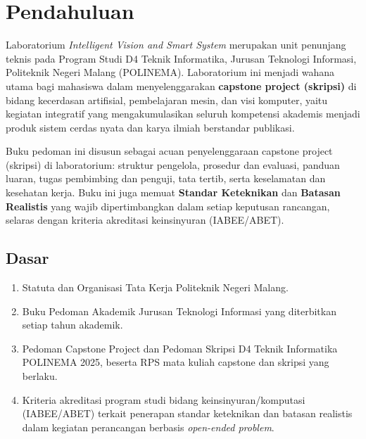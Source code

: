 \documentclass[12pt,a4paper]{report}
\begin{document}
\PedomanCover

\clearpage
\tableofcontents

\clearpage
{}

\chapter{Pendahuluan}

Laboratorium \emph{Intelligent Vision and Smart System} merupakan unit penunjang teknis pada Program Studi D4 Teknik Informatika, Jurusan Teknologi Informasi, Politeknik Negeri Malang (POLINEMA). Laboratorium ini menjadi wahana utama bagi mahasiswa dalam menyelenggarakan \textbf{capstone project (skripsi)} di bidang kecerdasan artifisial, pembelajaran mesin, dan visi komputer, yaitu kegiatan integratif yang mengakumulasikan seluruh kompetensi akademis menjadi produk sistem cerdas nyata dan karya ilmiah berstandar publikasi.

Buku pedoman ini disusun sebagai acuan penyelenggaraan capstone project (skripsi) di laboratorium: struktur pengelola, prosedur dan evaluasi, panduan luaran, tugas pembimbing dan penguji, tata tertib, serta keselamatan dan kesehatan kerja. Buku ini juga memuat \textbf{Standar Keteknikan} dan \textbf{Batasan Realistis} yang wajib dipertimbangkan dalam setiap keputusan rancangan, selaras dengan kriteria akreditasi keinsinyuran (IABEE/ABET).

\section{Dasar}
\begin{enumerate}
\item Statuta dan Organisasi Tata Kerja Politeknik Negeri Malang.
\item Buku Pedoman Akademik Jurusan Teknologi Informasi yang diterbitkan setiap tahun akademik.
\item Pedoman Capstone Project dan Pedoman Skripsi D4 Teknik Informatika POLINEMA 2025, beserta RPS mata kuliah capstone dan skripsi yang berlaku.
\item Kriteria akreditasi program studi bidang keinsinyuran/komputasi (IABEE/ABET) terkait penerapan standar keteknikan dan batasan realistis dalam kegiatan perancangan berbasis \emph{open-ended problem}.
\end{enumerate}
\end{document}
